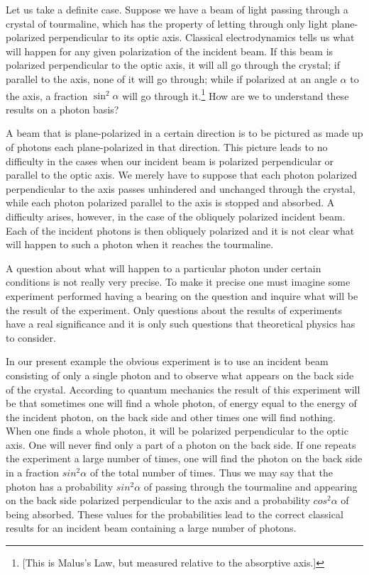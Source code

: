 Let us take a definite case.  Suppose we have a beam of light passing through a crystal of tourmaline, which has the property of letting through only light plane-polarized perpendicular to its optic axis.  Classical electrodynamics tells us what will happen for any given polarization of the incident beam.  If this beam is polarized perpendicular to the optic axis, it will all go through the crystal; if parallel to the axis, none of it will go through; while if polarized at an angle $\alpha$ to the axis, a fraction $\sin^2\alpha$ will go through it.\footnote{[This is Malus's Law, but measured relative to the absorptive axis.]}  How are we to understand these results on a photon basis?

A beam that is plane-polarized in a certain direction is to be pictured as made up of photons each plane-polarized in that direction.  This picture leads to no difficulty in the cases when our incident beam is polarized perpendicular or parallel to the optic axis.  We merely have to suppose that each photon polarized perpendicular to the axis passes unhindered and unchanged through the crystal, while each photon polarized parallel to the axis is stopped and absorbed.  A difficulty arises, however, in the case of the obliquely polarized incident beam.  Each of the incident photons is then obliquely polarized and it is not clear what will happen to such a photon when it reaches the tourmaline.

A question about what will happen to a particular photon under certain conditions is not really very precise.  To make it precise one must imagine some experiment performed having a bearing on the question and inquire what will be the result of the experiment.  Only questions about the results of experiments have a real significance and it is only such questions that theoretical physics has to consider.

In our present example the obvious experiment is to use an incident beam consisting of only a single photon and to observe what appears on the back side of the crystal.  According to quantum mechanics the result of this experiment will be that sometimes one will find a whole photon, of energy equal to the energy of the incident photon, on the back side and other times one will find nothing.  When one finds a whole photon, it will be polarized perpendicular to the optic axis.  One will never find only a part of a photon on the back side.  If one repeats the experiment a large number of times, one will find the photon on the back side in a fraction $sin^2\alpha$ of the total number of times.  Thus we may say that the photon has a probability $sin^2\alpha$ of passing through the tourmaline and appearing on the back side polarized perpendicular to the axis and a probability $cos^2\alpha$ of being absorbed.  These values for the probabilities lead to the correct classical results for an incident beam containing a large number of photons.


